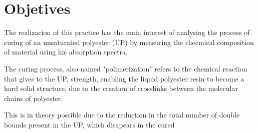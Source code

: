\chapter{Objetives}\label{cap:objetives}

The realizacion of this practice has the main interest of analysing the
process of curing of an unsaturated polyester (UP) by measuring the
checmical composition of material using his absorption spectra.

The curing process, also named "polimerization" refers to the chemical reaction
that gives to the UP, strength, enabling the liquid polyester resin to become a
hard solid structure, due to the creation of crosslinks between the molecular chains
of polyester.

This is in theory possible due to the reduction in the total number of double bounds
present in the UP, which disapears in the cured
